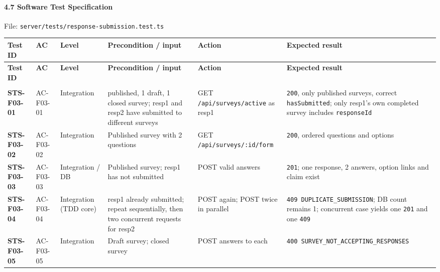 \documentclass[12pt,a4paper]{article}
\begin{document}
\paragraph*{4.7 Software Test Specification}
File: \texttt{server/tests/response-submission.test.ts}

{\setlength{\tabcolsep}{3pt}\renewcommand{\arraystretch}{1.08}\scriptsize
\begin{longtable}{@{}>{\raggedright\arraybackslash}p{}>{\raggedright\arraybackslash}p{}>{\raggedright\arraybackslash}p{}>{\raggedright\arraybackslash}p{}>{\raggedright\arraybackslash}p{}>{\raggedright\arraybackslash}p{}@{}}
\toprule
\textbf{Test ID} & \textbf{AC} & \textbf{Level} & \textbf{Precondition / input} & \textbf{Action} & \textbf{Expected result} \\
\midrule
\endfirsthead
\toprule
\textbf{Test ID} & \textbf{AC} & \textbf{Level} & \textbf{Precondition / input} & \textbf{Action} & \textbf{Expected result} \\
\midrule
\endhead
\midrule
\multicolumn{6}{r}{\footnotesize\textit{Continued on next page}}\\
\endfoot
\bottomrule
\endlastfoot
\textbf{STS-F03-01} & AC-F03-01 & Integration & 1 published, 1 draft, 1 closed survey; resp1 and resp2 have submitted to different surveys & GET \texttt{/api/surveys/active} as resp1 & \texttt{200}, only published surveys, correct \texttt{hasSubmitted}; only resp1's own completed survey includes \texttt{responseId} \\
\textbf{STS-F03-02} & AC-F03-02 & Integration & Published survey with 2 questions & GET \texttt{/api/surveys/:id/form} & \texttt{200}, ordered questions and options \\
\textbf{STS-F03-03} & AC-F03-03 & Integration / DB & Published survey; resp1 has not submitted & POST valid answers & \texttt{201}; one response, 2 answers, option links and claim exist \\
\textbf{STS-F03-04} & AC-F03-04 & Integration (TDD core) & resp1 already submitted; repeat sequentially, then two concurrent requests for resp2 & POST again; POST twice in parallel & \texttt{409 DUPLICATE\_SUBMISSION}; DB count remains 1; concurrent case yields one \texttt{201} and one \texttt{409} \\
\textbf{STS-F03-05} & AC-F03-05 & Integration & Draft survey; closed survey & POST answers to each & \texttt{400 SURVEY\_NOT\_ACCEPTING\_RESPONSES} \\

\end{longtable}}
\end{document}
